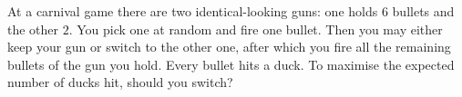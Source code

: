 At a carnival game there are two identical-looking guns: one holds $6$ bullets and the other $2$. You pick one at random and fire one bullet. Then you may either keep your gun or switch to the other one, after which you fire all the remaining bullets of the gun you hold. Every bullet hits a duck. To maximise the expected number of ducks hit, should you switch?

